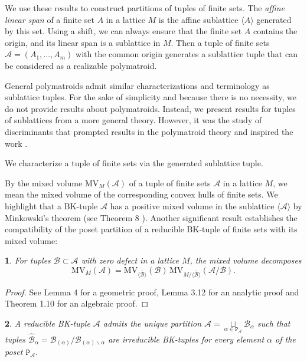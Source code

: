 \documentclass[11pt]{article}
\theoremstyle{plain}
\newtheorem{thm}{\protect\theoremname}[section]
\theoremstyle{definition}
\theoremstyle{remark}
\theoremstyle{plain}
\theoremstyle{plain}
\theoremstyle{plain}
\newtheorem{cor}[thm]{\protect\corollaryname}
\theoremstyle{definition}
\providecommand{\corollaryname}{Corollary}
\providecommand{\theoremname}{Theorem}
\begin{document}
We use these results to construct partitions of tuples of finite sets.
The \textit{affine linear span} of a finite set $A$ in a lattice
$M$ is the affine sublattice $\langle A\rangle$ generated by this
set. Using a shift, we can always ensure that the finite set $A$
contains the origin, and its linear span is a sublattice in $M$.
Then a tuple of finite sets $\mathscr{A}=(A_{1},...,A_{m})$ with
the common origin generates a sublattice tuple that can be considered
as a realizable polymatroid.

General polymatroids admit similar characterizations and terminology
as sublattice tuples. For the sake of simplicity and because there
is no necessity, we do not provide results about polymatroids. Instead,
we present results for tuples of sublattices from a more general theory.
However, it was the study of discriminants that prompted results in
the polymatroid theory and inspired the work \cite{pokidkin_combinatorics_2025}.

We characterize a tuple of finite sets via the generated sublattice
tuple.

By the mixed volume $\mathrm{MV}_{M}(\mathscr{A})$ of a tuple of
finite sets $\mathscr{A}$ in a lattice $M$, we mean the mixed volume
of the corresponding convex hulls of finite sets. We highlight that
a BK-tuple $\mathscr{A}$ has a positive mixed volume in the sublattice
$\langle\mathscr{A}\rangle$ by Minkowski's theorem (see Theorem 8
\cite{khovanskii_newton_2016}). Another significant result establishes
the compatibility of the poset partition of a reducible BK-tuple of
finite sets with its mixed volume:
\begin{thm}
\label{Theorem. BK-subtuple and mixed volume}For tuples $\mathscr{B}\subset\mathscr{A}$
with zero defect in a lattice $M$, the mixed volume decomposes 
\[
\mathrm{MV}_{M}(\mathscr{A})=\mathrm{MV}_{\overline{\langle\mathscr{B}\rangle}}(\mathscr{B})\,\mathrm{MV}_{M/\overline{\langle\mathscr{B}\rangle}}(\mathscr{A}/\mathscr{B}).
\]
\end{thm}

\begin{proof}
See Lemma 4 \cite{steffens_mixed_2010} for a geometric proof, Lemma
3.12 \cite{dandrea_poisson_2015} for an analytic proof and Theorem
1.10 \cite{esterov_galois_2019} for an algebraic proof.
\end{proof}
\begin{cor}
\textup{\label{Corollary. Unique decomposition of a BK-tuple}}A reducible
BK-tuple $\mathscr{A}$ admits the unique partition $\mathscr{A}=\underset{\alpha\in\mathtt{P}_{\mathscr{A}}}{\sqcup}\mathscr{B}_{\alpha}$
such that tuples $\hat{\mathscr{B}}_{\alpha}=\mathscr{B}_{(\alpha)}/\mathscr{B}_{(\alpha)\backslash\alpha}$
are irreducible BK-tuples for every element $\alpha$ of the poset
$\mathtt{P}_{\mathscr{A}}.$
\end{cor}
\end{document}
